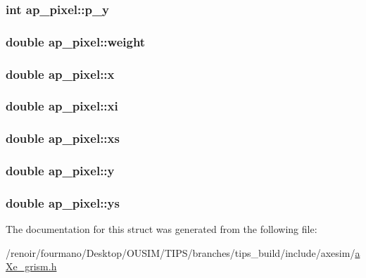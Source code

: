 \label{structap__pixel_abca28f0936fbd5a569ad548fb25e5a38}
\hypertarget{structap__pixel_aadf7ee52df3875792fbf13d4d52ed298}{
\subsubsection[{p\_\-y}]{\setlength{\rightskip}{0pt plus 5cm}int {\bf ap\_\-pixel::p\_\-y}}}
\label{structap__pixel_aadf7ee52df3875792fbf13d4d52ed298}
\hypertarget{structap__pixel_a34600405e114d4bd366c1d33860aff14}{
\subsubsection[{weight}]{\setlength{\rightskip}{0pt plus 5cm}double {\bf ap\_\-pixel::weight}}}
\label{structap__pixel_a34600405e114d4bd366c1d33860aff14}
\hypertarget{structap__pixel_a0ce028c33a28f543bd9255324800e9ea}{
\subsubsection[{x}]{\setlength{\rightskip}{0pt plus 5cm}double {\bf ap\_\-pixel::x}}}
\label{structap__pixel_a0ce028c33a28f543bd9255324800e9ea}
\hypertarget{structap__pixel_aeae2e14e0f53bd1090acb2a8758104a5}{
\subsubsection[{xi}]{\setlength{\rightskip}{0pt plus 5cm}double {\bf ap\_\-pixel::xi}}}
\label{structap__pixel_aeae2e14e0f53bd1090acb2a8758104a5}
\hypertarget{structap__pixel_aa6a80bf7f2a556b5d846bb3b987450ee}{
\subsubsection[{xs}]{\setlength{\rightskip}{0pt plus 5cm}double {\bf ap\_\-pixel::xs}}}
\label{structap__pixel_aa6a80bf7f2a556b5d846bb3b987450ee}
\hypertarget{structap__pixel_a1df90884734bfaea8ec545b69d802281}{
\subsubsection[{y}]{\setlength{\rightskip}{0pt plus 5cm}double {\bf ap\_\-pixel::y}}}
\label{structap__pixel_a1df90884734bfaea8ec545b69d802281}
\hypertarget{structap__pixel_a54b55a4bbb06f7a9065699d976dae956}{
\subsubsection[{ys}]{\setlength{\rightskip}{0pt plus 5cm}double {\bf ap\_\-pixel::ys}}}
\label{structap__pixel_a54b55a4bbb06f7a9065699d976dae956}


The documentation for this struct was generated from the following file:\begin{DoxyCompactItemize}
\item 
/renoir/fourmano/Desktop/OUSIM/TIPS/branches/tips\_\-build/include/axesim/\hyperlink{aXe__grism_8h}{aXe\_\-grism.h}\end{DoxyCompactItemize}
